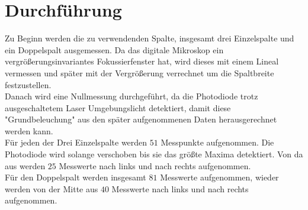 \section{Durchführung}
\label{sec:Durchführung}

Zu Beginn werden die zu verwendenden Spalte, insgesamt drei Einzelspalte und ein Doppelspalt ausgemessen. Da das digitale Mikroskop ein vergrößerungsinvariantes Fokussierfenster hat, wird dieses mit einem Lineal vermessen und später mit der Vergrößerung verrechnet um die Spaltbreite festzustellen.\\
Danach wird eine Nullmessung durchgeführt, da die Photodiode trotz ausgeschaltetem Laser Umgebungslicht detektiert, damit diese "Grundbeleuchung" aus den später aufgenommenen Daten herausgerechnet werden kann.\\
Für jeden der Drei Einzelspalte werden $51$ Messpunkte aufgenommen. Die Photodiode wird solange verschoben bis sie das größte Maxima detektiert. Von da aus werden $25$ Messwerte nach links und nach rechts  aufgenommen.\\
Für den Doppelspalt werden insgesamt $81$ Messwerte aufgenommen, wieder werden von der Mitte aus $40$ Messwerte nach links und nach rechts aufgenommen.
